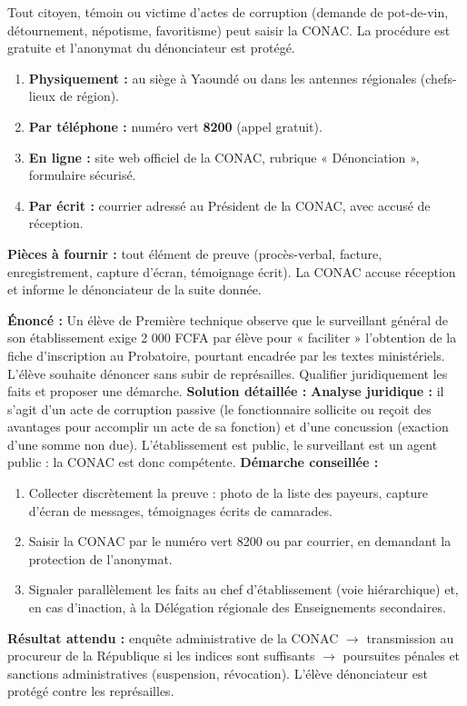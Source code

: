 \documentclass[11pt]{article}
\begin{document}
\begin{methode}
Tout citoyen, témoin ou victime d'actes de corruption (demande de pot-de-vin, détournement, népotisme, favoritisme) peut saisir la CONAC. La procédure est gratuite et l'anonymat du dénonciateur est protégé.
\begin{enumerate}
\item \textbf{Physiquement :} au siège à Yaoundé ou dans les antennes régionales (chefs-lieux de région).
\item \textbf{Par téléphone :} numéro vert \textbf{8200} (appel gratuit).
\item \textbf{En ligne :} site web officiel de la CONAC, rubrique « Dénonciation », formulaire sécurisé.
\item \textbf{Par écrit :} courrier adressé au Président de la CONAC, avec accusé de réception.
\end{enumerate}
\textbf{Pièces à fournir :} tout élément de preuve (procès-verbal, facture, enregistrement, capture d'écran, témoignage écrit). La CONAC accuse réception et informe le dénonciateur de la suite donnée.
\end{methode}

\begin{exoresolu}
\textbf{Énoncé :} Un élève de Première technique observe que le surveillant général de son établissement exige 2 000 FCFA par élève pour « faciliter » l'obtention de la fiche d'inscription au Probatoire, pourtant encadrée par les textes ministériels. L'élève souhaite dénoncer sans subir de représailles. Qualifier juridiquement les faits et proposer une démarche.
\tcblower
\textbf{Solution détaillée :}
\textbf{Analyse juridique :} il s'agit d'un acte de corruption passive (le fonctionnaire sollicite ou reçoit des avantages pour accomplir un acte de sa fonction) et d'une concussion (exaction d'une somme non due). L'établissement est public, le surveillant est un agent public : la CONAC est donc compétente.
\textbf{Démarche conseillée :}
\begin{enumerate}
\item Collecter discrètement la preuve : photo de la liste des payeurs, capture d'écran de messages, témoignages écrits de camarades.
\item Saisir la CONAC par le numéro vert 8200 ou par courrier, en demandant la protection de l'anonymat.
\item Signaler parallèlement les faits au chef d'établissement (voie hiérarchique) et, en cas d'inaction, à la Délégation régionale des Enseignements secondaires.
\end{enumerate}
\textbf{Résultat attendu :} enquête administrative de la CONAC $\rightarrow$ transmission au procureur de la République si les indices sont suffisants $\rightarrow$ poursuites pénales et sanctions administratives (suspension, révocation). L'élève dénonciateur est protégé contre les représailles.
\end{exoresolu}
\end{document}
